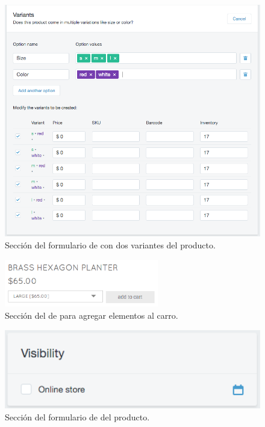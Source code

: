 \begin{figure}[H]
	\centering
	\includegraphics[width=1\textwidth]{figuras/productos/examples/shopify_product_variant_with_info.png}
	\caption{Sección \VariantsForm del formulario de \shopifyNAME con dos variantes del producto.}
	\label{figure:productos:example:shopify_product_variant_with_info}
\end{figure}

\begin{figure}[H]
	\centering
	\includegraphics[width=0.6\textwidth]{figuras/productos/examples/leifshop_product_section_add_to_cart.png}
	\caption{Sección del \websiteINT de \leifShopNAME para agregar elementos al carro.}
	\label{figure:productos:example:leifshop_product_section_add_to_cart}
\end{figure}

\begin{figure}[H]
	\centering
	\includegraphics[width=1\textwidth]{figuras/productos/examples/shopify_product_visibility.png}
	\caption{Sección \VisibilityForm del formulario de \shopifyNAME del producto.}
	\label{figure:productos:example:shopify_product_visibility}
\end{figure}

